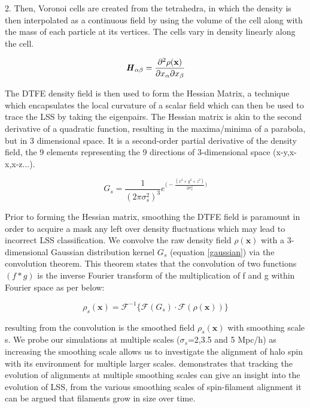 \documentclass[a4paper,fleqn,usenatbib]{mnras}
\begin{document}
2. Then, Voronoi cells are created from the tetrahedra, in which the density is then interpolated as a continuous field by using the volume of the cell along with the mass of each particle at its vertices. The cells vary in density linearly along the cell.
\begin{ceqn}
\begin{equation}
\textbf{\textit{H}}_{\alpha \beta}=\frac{\partial^{2}\rho(\textbf{x})}{\partial x_{\alpha}\partial x_{\beta}}\label{hess}
\end{equation}
\end{ceqn}
The DTFE density field is then used to form the Hessian Matrix, a technique which encapsulates the local curvature of a scalar field which can then be used to trace the LSS by taking the eigenpairs. The Hessian matrix is akin to the second derivative of a quadratic function, resulting in the maxima/minima of a parabola, but in 3 dimensional space. It is a second-order partial derivative of the density field, the 9 elements representing the 9 directions of 3-dimensional space (x-y,x-x,x-z...). 
\begin{ceqn}
\begin{equation}
G_{s}=\frac{1}{(2\pi\sigma^{2}_s)^{3}}e^{\Big(-\frac{(x^{2}+y^{2}+z^{2})}{2\sigma^{2}_{s}}\Big)}
\label{gaussian}
\end{equation}
\end{ceqn}
Prior to forming the Hessian matrix, smoothing the DTFE field is paramount in order to acquire a mask any left over density fluctuations which may lead to incorrect LSS classification. We convolve the raw density field $\rho(\textbf{x})$ with a 3-dimensional Gaussian distribution kernel $G_{s}$ (equation \ref{gaussian}) via the convolution theorem. This theorem states that the convolution of two functions $(f\ast g)$ is the inverse Fourier transform of the multiplication of f and g within Fourier space as per below:
\begin{ceqn}
\begin{equation}
\rho_{s}(\textbf{x})=\mathcal{F}^{-1}\Big\{\mathcal{F}(G_{s})\cdot \mathcal{F}(\rho(\textbf{x}))\Big\} 
\label{fourioreqn}
\end{equation}
\end{ceqn}
resulting from the convolution is the smoothed field $\rho_{s}(\textbf{x})$ with smoothing scale s. We probe our simulations at multiple scales ($\sigma_s$=2,3.5 and 5 Mpc/h) as increasing the smoothing scale allows us to investigate the alignment of halo spin with its environment for multiple larger scales. \citet{Trowland_13} demonstrates that tracking the evolution of alignments at multiple smoothing scales can give an insight into the evolution of LSS, from the various smoothing scales of spin-filament alignment it can be argued that filaments grow in size over time. 
\end{document}
